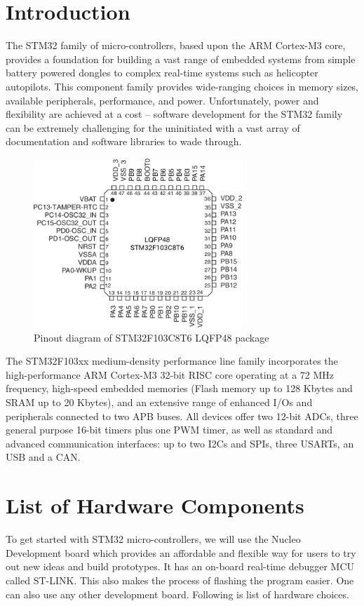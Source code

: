 \documentclass[a4paper,12pt,oneside]{book}
\begin{document}
\section{Introduction}
The STM32 family of micro-controllers, based upon the ARM Cortex-M3 core, provides a foundation for building a vast range of embedded systems from simple battery powered dongles to complex real-time systems such as helicopter autopilots. This component family provides wide-ranging choices in memory sizes, available peripherals, performance, and power. Unfortunately, power and flexibility are achieved at a cost – software development for the STM32 family can be extremely challenging for the uninitiated with a vast array of documentation and software libraries to wade through.\cite{geob}\\

\begin{figure}[!htb]
\centering
\includegraphics[width=0.7\textwidth]{images/stm32_pinout}
\caption{Pinout diagram of STM32F103C8T6 LQFP48 package}
\label{fig:stm32pin}
\end{figure}

\bigskip

The STM32F103xx medium-density performance line family incorporates the high-performance ARM Cortex-M3 32-bit RISC core operating at a 72 MHz frequency, high-speed embedded memories (Flash memory up to 128 Kbytes and SRAM up to 20 Kbytes), and an extensive range of enhanced I/Os and peripherals connected to two APB buses. All devices offer two 12-bit ADCs, three general purpose 16-bit timers plus one PWM timer, as well as standard and advanced communication interfaces: up to two I2Cs and SPIs, three USARTs, an USB and a CAN.\cite{stm32}\\

\section{List of Hardware Components}
To get started with STM32 micro-controllers, we will use the Nucleo Development board which provides an affordable and flexible way for users to try out new ideas and build prototypes. It has an on-board real-time debugger MCU called ST-LINK. This also makes the process of flashing the program easier. One can also use any other development board. Following is list of hardware choices.\\
\end{document}

